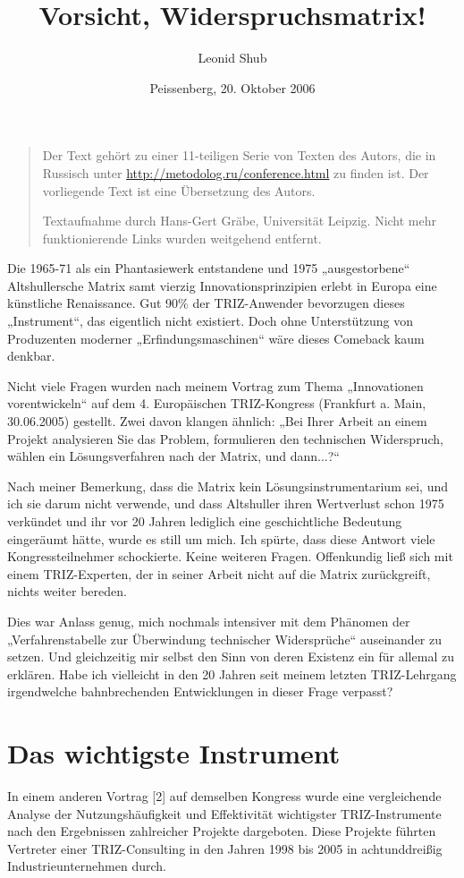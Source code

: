 \documentclass[11pt,a4paper]{article}
\title{Vorsicht, Widerspruchsmatrix!}
\author{Leonid Shub}
\date{Peissenberg, 20. Oktober 2006}
\begin{document}
\maketitle

\begin{quote}
  Der Text gehört zu einer 11-teiligen Serie von Texten des Autors, die in
  Russisch unter \url{http://metodolog.ru/conference.html} zu finden ist. Der
  vorliegende Text ist eine Übersetzung des Autors.

  Textaufnahme durch Hans-Gert Gräbe, Universität Leipzig. Nicht mehr
  funktionierende Links wurden weitgehend entfernt.
\end{quote}
  
Die 1965-71 als ein Phantasiewerk entstandene und 1975 „ausgestorbene“
Altshullersche Matrix samt vierzig Innovationsprinzipien erlebt in Europa eine
künstliche Renaissance.  Gut 90\% der TRIZ-Anwender bevorzugen dieses
„Instrument“, das eigentlich nicht existiert. Doch ohne Unterstützung von
Produzenten moderner „Erfindungsmaschinen“ wäre dieses Comeback kaum denkbar.

Nicht viele Fragen wurden nach meinem Vortrag zum Thema „Innovationen
vorentwickeln“ auf dem 4. Europäischen TRIZ-Kongress (Frankfurt a. Main,
30.06.2005) gestellt. Zwei davon klangen ähnlich: „Bei Ihrer Arbeit an einem
Projekt analysieren Sie das Problem, formulieren den technischen Widerspruch,
wählen ein Lösungsverfahren nach der Matrix, und dann...?“

Nach meiner Bemerkung, dass die Matrix kein Lösungsinstrumentarium sei, und
ich sie darum nicht verwende, und dass Altshuller ihren Wertverlust schon 1975
verkündet und ihr vor 20 Jahren lediglich eine geschichtliche Bedeutung
eingeräumt hätte, wurde es still um mich. Ich spürte, dass diese Antwort viele
Kongressteilnehmer schockierte. Keine weiteren Fragen. Offenkundig ließ sich
mit einem TRIZ-Experten, der in seiner Arbeit nicht auf die Matrix
zurückgreift, nichts weiter bereden.

Dies war Anlass genug, mich nochmals intensiver mit dem Phänomen der
„Verfahrenstabelle zur Überwindung technischer Widersprüche“ auseinander zu
setzen. Und gleichzeitig mir selbst den Sinn von deren Existenz ein für
allemal zu erklären. Habe ich vielleicht in den 20 Jahren seit meinem letzten
TRIZ-Lehrgang irgendwelche bahnbrechenden Entwicklungen in dieser Frage
verpasst?

\section*{Das wichtigste Instrument}
In einem anderen Vortrag [2] auf demselben Kongress wurde eine vergleichende
Analyse der Nutzungshäufigkeit und Effektivität wichtigster TRIZ-Instrumente
nach den Ergebnissen zahlreicher Projekte dargeboten. Diese Projekte führten
Vertreter einer TRIZ-Consulting in den Jahren 1998 bis 2005 in achtunddreißig
Industrieunternehmen durch.
\end{document}
